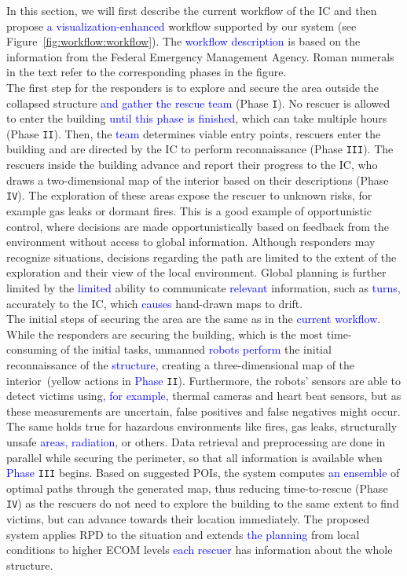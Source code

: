 \documentclass{egpubl}
\newcommand{\diff}[1]{\textcolor{blue}{#1}}
\begin{document}
In this section, we will first describe the current workflow of the IC and then propose \diff{a visualization-enhanced} workflow supported by our system (see Figure~\ref{fig:workflow:workflow}). The \diff{workflow description} is based on the information from the Federal Emergency Management Agency. Roman numerals in the text refer to the corresponding phases in the figure.\\
%
 The first step for the responders is to explore and secure the area outside the collapsed structure \diff{and gather the rescue team} (Phase \texttt{I}). No rescuer is allowed to enter the building \diff{until this phase is finished}, which can take multiple hours (Phase \texttt{II}). Then, the \diff{team} determines viable entry points, rescuers enter the building and are directed by the IC to perform reconnaissance (Phase \texttt{III}). The rescuers inside the building advance and report their progress to the IC, who draws a two-dimensional map of the interior based on their descriptions (Phase \texttt{IV}). The exploration of these areas expose the rescuer to unknown risks, for example gas leaks or dormant fires. This is a good example of opportunistic control, where decisions are made opportunistically based on feedback from the environment without access to global information. Although responders may recognize situations, decisions regarding the path are limited to the extent of the exploration and their view of the local environment. Global planning is further limited by the \diff{limited} ability to communicate \diff{relevant} information, such as \diff{turns}, accurately to the IC, which \diff{causes} hand-drawn maps to drift.\\
%
 The initial steps of securing the area are the same as in the \diff{current workflow}. While the responders are securing the building, which is the most time-consuming of the initial tasks, unmanned \diff{robots perform} the initial reconnaissance of the \diff{structure}, creating a three-dimensional map of the interior~(yellow actions in \diff{Phase} \texttt{II}). Furthermore, the robots' sensors are able to detect victims using\diff{, for example,} thermal cameras and heart beat sensors, but as these measurements are uncertain, false positives and false negatives might occur. The same holds true for hazardous environments like fires, gas leaks, structurally unsafe \diff{areas, radiation}, or others. Data retrieval and preprocessing are done in parallel while securing the perimeter, so that all information is available when \diff{Phase} \texttt{III} begins. Based on suggested POIs, the system computes \diff{an ensemble} of optimal paths through the generated map, thus reducing time-to-rescue (Phase \texttt{IV}) as the rescuers do not need to explore the building to the same extent to find victims, but can advance towards their location immediately. The proposed system applies RPD to the situation and extends \diff{the planning} from local conditions to higher ECOM levels \diff{each rescuer} has information about the whole structure.
\end{document}
